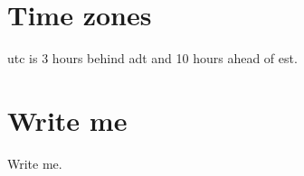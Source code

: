 \documentclass{article}
\begin{document}

% 


\section{Time zones}
\gls{utc} is 3 hours behind \gls{adt} and 10 hours ahead of \gls{est}.

\section{Write me}
\label{sec:write-me}
Write me.~\cite{www:pdflatex-makefile}


% 

\printglossaries
\end{document}
